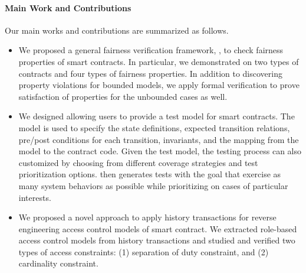 \paragraph{Main Work and Contributions}
Our main works and contributions are summarized as follows.
\begin{itemize}[leftmargin=*,topsep=4pt]
\item We proposed a general fairness verification framework, \faircon, to check fairness properties of smart contracts.
In particular, we demonstrated \faircon on two types of contracts and four types of fairness properties.
In addition to discovering property violations for bounded models, we apply formal
verification to prove satisfaction of properties for the unbounded cases as well.

\item We designed \modcon allowing users to provide a test model for smart contracts. 
The model is used to specify the state definitions, expected transition relations, pre/post conditions for each transition, invariants, and the mapping from the model to the contract code.
Given the test model, the testing process can also customized by choosing from different coverage strategies and test prioritization options.
\modcon then generates tests with the goal that exercise as many system behaviors as possible while prioritizing on cases of particular interests.
  
\item  We proposed a novel approach to apply history transactions for reverse engineering access control models of smart contract. 
We extracted role-based access control models from history transactions and studied and verified two types of access constraints: (1) separation of duty constraint, and (2) cardinality constraint.
\end{itemize}




